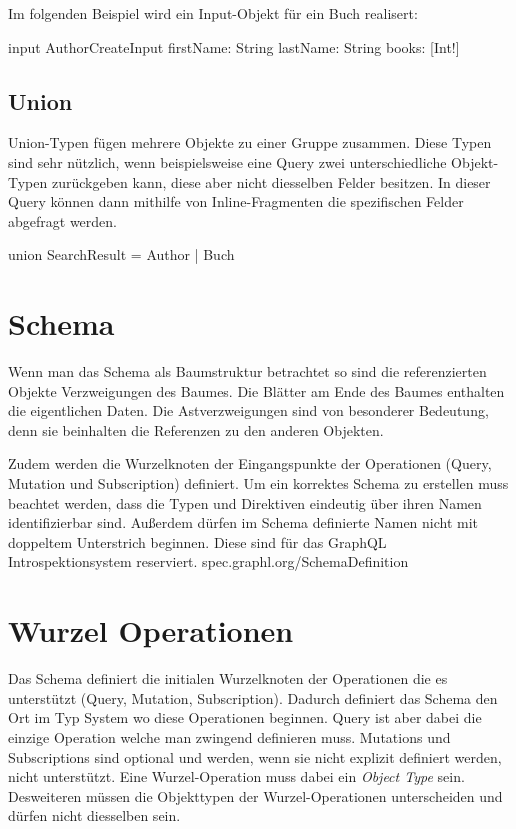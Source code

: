 Im folgenden Beispiel wird ein Input-Objekt für ein Buch realisert:
\begin{JsCode}
input AuthorCreateInput {
  firstName: String
  lastName: String
  books: [Int!]
}
\end{JsCode}


\subsection{Union}
Union-Typen fügen mehrere Objekte zu einer Gruppe zusammen.
Diese Typen sind sehr nützlich, wenn beispielsweise eine Query zwei unterschiedliche Objekt-Typen zurückgeben kann, diese aber nicht diesselben Felder besitzen.
In dieser Query können dann mithilfe von Inline-Fragmenten die spezifischen Felder abgefragt werden.

\begin{JsCode}
union SearchResult = Author | Buch
\end{JsCode}

\section{Schema}
Wenn man das Schema als Baumstruktur betrachtet so sind die referenzierten Objekte Verzweigungen des Baumes.
Die Blätter am Ende des Baumes enthalten die eigentlichen Daten.
Die Astverzweigungen sind von besonderer Bedeutung, denn sie beinhalten die Referenzen zu den anderen Objekten.

Zudem werden die Wurzelknoten der Eingangspunkte der Operationen (Query, Mutation und Subscription) definiert.
Um ein korrektes Schema zu erstellen muss beachtet werden, dass die Typen und Direktiven eindeutig über ihren Namen identifizierbar sind. Außerdem dürfen im Schema definierte Namen nicht mit doppeltem Unterstrich beginnen.
Diese sind für das GraphQL Introspektionsystem reserviert. spec.graphl.org/SchemaDefinition

\section{Wurzel Operationen}
Das Schema definiert die initialen Wurzelknoten der Operationen die es unterstützt (Query, Mutation, Subscription). Dadurch definiert das Schema den Ort im Typ System wo diese Operationen beginnen.
Query ist aber dabei die einzige Operation welche man zwingend definieren muss. Mutations und Subscriptions sind optional und werden, wenn sie nicht explizit definiert werden, nicht unterstützt.
Eine Wurzel-Operation muss dabei ein \textit{Object Type} sein. Desweiteren müssen die Objekttypen der Wurzel-Operationen unterscheiden und dürfen nicht diesselben sein. 
\newline

